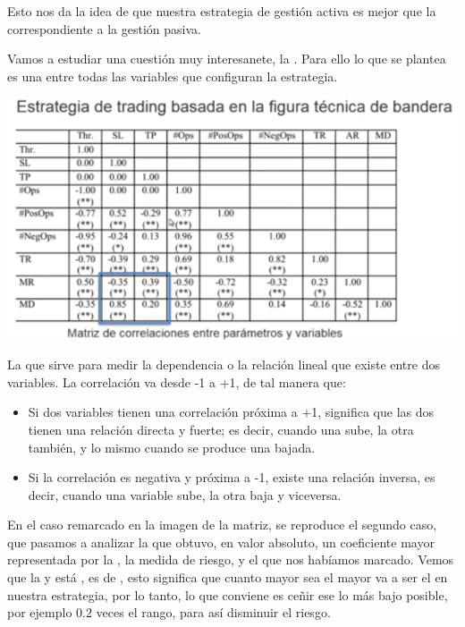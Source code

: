 Esto nos da la idea de que nuestra estrategia de gestión activa es mejor que la correspondiente a la gestión pasiva.

Vamos a estudiar una cuestión muy interesanete, la . Para ello lo que se plantea es una  entre todas las variables que configuran la estrategia.
\begin{center}
    \includegraphics[scale=.65]{images/mod03-18.png}
\end{center}
La  que sirve para medir la dependencia o la relación lineal que existe entre dos variables. La correlación va desde -1 a +1, de tal manera que:
\begin{itemize}
    \item Si dos variables tienen una correlación próxima a +1, significa que las dos tienen una relación directa y fuerte; es decir, cuando una sube, la otra también, y lo mismo cuando se produce una bajada.
    \item Si la correlación es negativa y próxima a -1, existe una relación inversa, es decir, cuando una variable sube, la otra baja y viceversa.
\end{itemize} 

En el caso remarcado en la imagen de la matriz, se reproduce el segundo caso, que pasamos a analizar la que obtuvo, en valor absoluto, un coeficiente mayor representada por la , la medida de riesgo, y el  que nos habíamos marcado. Vemos que la  y está , es de , esto significa que cuanto mayor sea el  mayor va a ser el  en nuestra estrategia, por lo tanto, lo que conviene es ceñir ese  lo más bajo posible, por ejemplo $0.2$ veces el rango, para así disminuir el riesgo.

